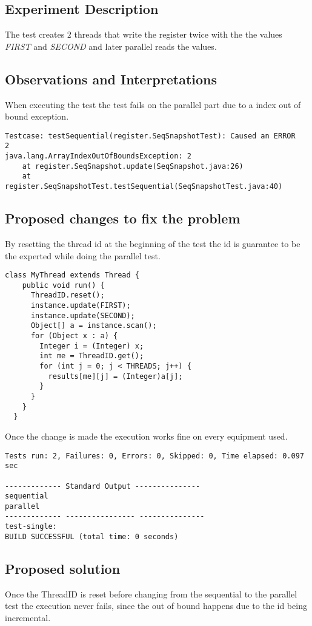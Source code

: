 
\subsection{Experiment Description} 
\par
The test creates $2$ threads that write the register twice with the the values \textit{FIRST} and \textit{SECOND} and later parallel reads the values.
\par


\subsection{Observations and Interpretations}

\par
When executing the test the test fails on the parallel part due to a index out of bound exception.
\begin{lstlisting}[frame=single,breaklines=true]
Testcase: testSequential(register.SeqSnapshotTest):	Caused an ERROR
2
java.lang.ArrayIndexOutOfBoundsException: 2
	at register.SeqSnapshot.update(SeqSnapshot.java:26)
	at register.SeqSnapshotTest.testSequential(SeqSnapshotTest.java:40)
\end{lstlisting}



\subsection{Proposed changes to fix the problem}

\par
By resetting the thread id at the beginning of the test the id is guarantee to be the experted while doing the parallel test.
\begin{lstlisting}[frame=single,breaklines=true]
  class MyThread extends Thread {
    public void run() {
      ThreadID.reset();
      instance.update(FIRST);
      instance.update(SECOND);
      Object[] a = instance.scan();
      for (Object x : a) {
        Integer i = (Integer) x;
        int me = ThreadID.get();
        for (int j = 0; j < THREADS; j++) {
          results[me][j] = (Integer)a[j];
        }
      }
    }
  }
\end{lstlisting}
Once the change is made the execution works fine on every equipment used.
\begin{lstlisting}[frame=single,breaklines=true]
Tests run: 2, Failures: 0, Errors: 0, Skipped: 0, Time elapsed: 0.097 sec

------------- Standard Output ---------------
sequential
parallel
------------- ---------------- ---------------
test-single:
BUILD SUCCESSFUL (total time: 0 seconds)
\end{lstlisting}



\subsection{Proposed solution}
\par
Once the ThreadID is reset before changing from the sequential to the parallel test the execution never fails, since the out of bound happens due to the id being incremental.

